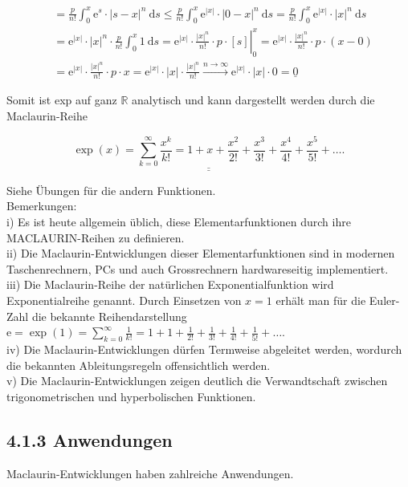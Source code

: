 \documentclass[10pt]{article}
\begin{document}
\begin{align*}
& =\frac{p}{n!} \int_{0}^{x} \mathrm{e}^{s} \cdot|s-x|^{n} \mathrm{~d} s \leq \frac{p}{n!} \int_{0}^{x} \mathrm{e}^{|x|} \cdot|0-x|^{n} \mathrm{~d} s=\frac{p}{n!} \int_{0}^{x} \mathrm{e}^{|x|} \cdot|x|^{n} \mathrm{~d} s \\
& =\mathrm{e}^{|x|} \cdot|x|^{n} \cdot \frac{p}{n!} \int_{0}^{x} 1 \mathrm{~d} s=\left.\mathrm{e}^{|x|} \cdot \frac{|x|^{n}}{n!} \cdot p \cdot[s]\right|_{0} ^{x}=\mathrm{e}^{|x|} \cdot \frac{|x|^{n}}{n!} \cdot p \cdot(x-0) \\
& =\mathrm{e}^{|x|} \cdot \frac{|x|^{n}}{n!} \cdot p \cdot x=\mathrm{e}^{|x|} \cdot|x| \cdot \frac{|x|^{n}}{n!} \xrightarrow{n \rightarrow \infty} \mathrm{e}^{|x|} \cdot|x| \cdot 0=\underline{0} \tag{4.14}
\end{align*}


Somit ist exp auf ganz $\mathbb{R}$ analytisch und kann dargestellt werden durch die Maclaurin-Reihe


\begin{equation*}
\underline{\underline{\exp (x)=\sum_{k=0}^{\infty} \frac{x^{k}}{k!}=1+x+\frac{x^{2}}{2!}+\frac{x^{3}}{3!}+\frac{x^{4}}{4!}+\frac{x^{5}}{5!}+\ldots .}} \tag{4.15}
\end{equation*}


Siehe Übungen für die andern Funktionen.\\
Bemerkungen:\\
i) Es ist heute allgemein üblich, diese Elementarfunktionen durch ihre MACLAURIN-Reihen zu definieren.\\
ii) Die Maclaurin-Entwicklungen dieser Elementarfunktionen sind in modernen Taschenrechnern, PCs und auch Grossrechnern hardwareseitig implementiert.\\
iii) Die Maclaurin-Reihe der natürlichen Exponentialfunktion wird Exponentialreihe genannt. Durch Einsetzen von $x=1$ erhält man für die Euler-Zahl die bekannte Reihendarstellung\\
$\mathrm{e}=\exp (1)=\sum_{k=0}^{\infty} \frac{1}{k!}=1+1+\frac{1}{2!}+\frac{1}{3!}+\frac{1}{4!}+\frac{1}{5!}+\ldots$.\\
iv) Die Maclaurin-Entwicklungen dürfen Termweise abgeleitet werden, wordurch die bekannten Ableitungsregeln offensichtlich werden.\\
v) Die Maclaurin-Entwicklungen zeigen deutlich die Verwandtschaft zwischen trigonometrischen und hyperbolischen Funktionen.

\subsection*{4.1.3 Anwendungen}
Maclaurin-Entwicklungen haben zahlreiche Anwendungen.
\end{document}
